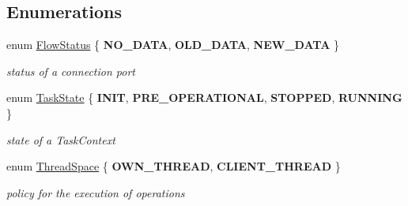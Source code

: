 \subsection*{Enumerations}
\begin{DoxyCompactItemize}
\item 
\hypertarget{namespacecoco_a057be58377e415c9be98c1dc5c8426ad}{}enum \hyperlink{namespacecoco_a057be58377e415c9be98c1dc5c8426ad}{Flow\+Status} \{ {\bfseries N\+O\+\_\+\+D\+A\+T\+A}, 
{\bfseries O\+L\+D\+\_\+\+D\+A\+T\+A}, 
{\bfseries N\+E\+W\+\_\+\+D\+A\+T\+A}
 \}\label{namespacecoco_a057be58377e415c9be98c1dc5c8426ad}

\begin{DoxyCompactList}\small\item\em status of a connection port \end{DoxyCompactList}\item 
\hypertarget{namespacecoco_afec53814046619bac93c2077706a6bd1}{}enum \hyperlink{namespacecoco_afec53814046619bac93c2077706a6bd1}{Task\+State} \{ {\bfseries I\+N\+I\+T}, 
{\bfseries P\+R\+E\+\_\+\+O\+P\+E\+R\+A\+T\+I\+O\+N\+A\+L}, 
{\bfseries S\+T\+O\+P\+P\+E\+D}, 
{\bfseries R\+U\+N\+N\+I\+N\+G}
 \}\label{namespacecoco_afec53814046619bac93c2077706a6bd1}

\begin{DoxyCompactList}\small\item\em state of a Task\+Context \end{DoxyCompactList}\item 
\hypertarget{namespacecoco_ada9a67964012e198cdc20a86ae7cbdd5}{}enum \hyperlink{namespacecoco_ada9a67964012e198cdc20a86ae7cbdd5}{Thread\+Space} \{ {\bfseries O\+W\+N\+\_\+\+T\+H\+R\+E\+A\+D}, 
{\bfseries C\+L\+I\+E\+N\+T\+\_\+\+T\+H\+R\+E\+A\+D}
 \}\label{namespacecoco_ada9a67964012e198cdc20a86ae7cbdd5}

\begin{DoxyCompactList}\small\item\em policy for the execution of operations \end{DoxyCompactList}\end{DoxyCompactItemize}
